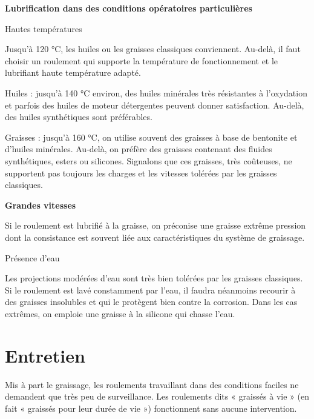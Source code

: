 \vspace{0.3cm}
\textbf{Lubrification dans des conditions opératoires particulières}
\vspace{0.3cm}

\vspace{0.3cm}
Hautes températures
\vspace{0.3cm}

Jusqu’à 120 °C, les huiles ou les graisses classiques conviennent. Au-delà, il faut choisir un roulement qui supporte la température de fonctionnement et le lubrifiant haute température adapté.
\vspace{0.3cm}

Huiles : jusqu’à 140 °C environ, des huiles minérales très résistantes à l’oxydation et parfois des huiles de moteur détergentes peuvent donner satisfaction. Au-delà, des huiles synthétiques sont préférables.
\vspace{0.3cm}

Graisses : jusqu’à 160 °C, on utilise souvent des graisses à base de bentonite et d’huiles minérales. Au-delà, on préfère des graisses contenant des fluides synthétiques, esters ou silicones. Signalons que ces graisses, très coûteuses, ne supportent pas toujours les charges et les vitesses tolérées par les graisses classiques.

\vspace{0.3cm}
\textbf{ Grandes vitesses}
\vspace{0.3cm}

Si le roulement est lubrifié à la graisse, on préconise une graisse extrême pression dont la consistance est souvent liée aux caractéristiques du système de graissage.


\vspace{0.3cm}
Présence d'eau
\vspace{0.3cm}

Les projections modérées d’eau sont très bien tolérées par les graisses classiques. Si le roulement est lavé constamment par l’eau, il faudra néanmoins recourir à des graisses insolubles et qui le protègent bien contre la corrosion. Dans les cas extrêmes, on emploie une graisse à la silicone qui chasse l’eau.



\section{Entretien}


Mis à part le graissage, les roulements travaillant dans des conditions faciles ne demandent que très peu de surveillance. Les roulements dits « graissés à vie » (en fait « graissés pour leur durée de vie ») fonctionnent sans aucune intervention. 
\vspace{0.3cm}

